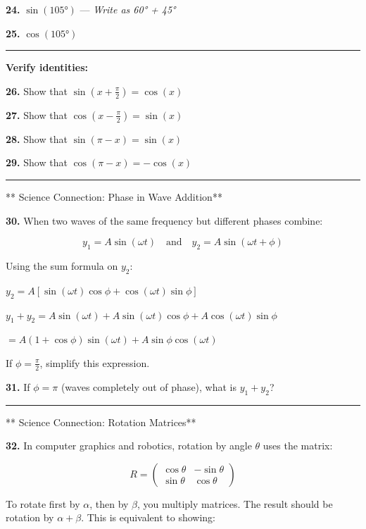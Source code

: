 \documentclass[
  11pt,
]{article}
\begin{document}
\textbf{24.} \(\sin(105°)\) --- \emph{Write as 60° + 45°}

\textbf{25.} \(\cos(105°)\)

\begin{center}\rule{0.5\linewidth}{0.5pt}\end{center}

\textbf{Verify identities:}

\textbf{26.} Show that \(\sin(x + \frac{\pi}{2}) = \cos(x)\)

\textbf{27.} Show that \(\cos(x - \frac{\pi}{2}) = \sin(x)\)

\textbf{28.} Show that \(\sin(\pi - x) = \sin(x)\)

\textbf{29.} Show that \(\cos(\pi - x) = -\cos(x)\)

\begin{center}\rule{0.5\linewidth}{0.5pt}\end{center}

** Science Connection: Phase in Wave Addition**

\textbf{30.} When two waves of the same frequency but different phases
combine:

\[y_1 = A\sin(\omega t) \quad \text{and} \quad y_2 = A\sin(\omega t + \phi)\]

Using the sum formula on \(y_2\):

\(y_2 = A[\sin(\omega t)\cos\phi + \cos(\omega t)\sin\phi]\)

\(y_1 + y_2 = A\sin(\omega t) + A\sin(\omega t)\cos\phi + A\cos(\omega t)\sin\phi\)

\(= A(1 + \cos\phi)\sin(\omega t) + A\sin\phi\cos(\omega t)\)

If \(\phi = \frac{\pi}{2}\), simplify this expression.

\textbf{31.} If \(\phi = \pi\) (waves completely out of phase), what is
\(y_1 + y_2\)?

\begin{center}\rule{0.5\linewidth}{0.5pt}\end{center}

** Science Connection: Rotation Matrices**

\textbf{32.} In computer graphics and robotics, rotation by angle
\(\theta\) uses the matrix:

\[R = \begin{pmatrix} \cos\theta & -\sin\theta \\ \sin\theta & \cos\theta \end{pmatrix}\]

To rotate first by \(\alpha\), then by \(\beta\), you multiply matrices.
The result should be rotation by \(\alpha + \beta\). This is equivalent
to showing:
\end{document}
